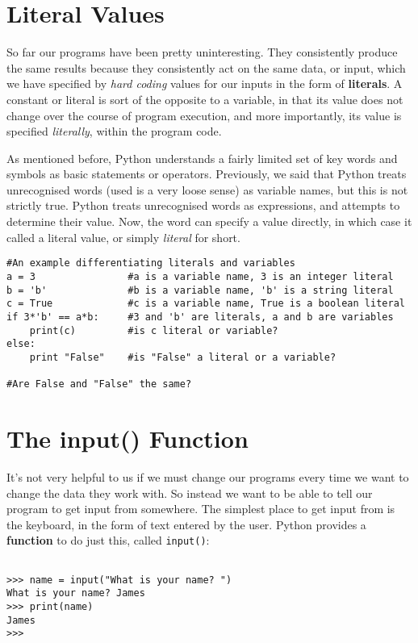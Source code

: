
\section{Literal Values}

So far our programs have been pretty uninteresting. They     consistently produce the same results because they consistently act on     the same data, or input, which we have specified by \textit{hard       coding} values for our inputs in the form of     \textbf{literals}. A constant or literal is sort of the opposite to a     variable, in that its value does not change over the course of program     execution, and more importantly, its value is specified     \textit{literally}, within the program code.

As mentioned before, Python understands a fairly limited set of key     words and symbols as basic statements or operators. Previously, we     said that Python treats unrecognised words (used is a very loose sense)     as variable names, but this is not strictly true. Python treats     unrecognised words as expressions, and attempts to determine their     value. Now, the word can specify a value directly, in which case it     called a literal value, or simply \textit{literal} for short. 
\begin{lstlisting}
#An example differentiating literals and variables
a = 3                #a is a variable name, 3 is an integer literal
b = 'b'              #b is a variable name, 'b' is a string literal
c = True             #c is a variable name, True is a boolean literal
if 3*'b' == a*b:     #3 and 'b' are literals, a and b are variables
    print(c)         #is c literal or variable?
else:
    print "False"    #is "False" a literal or a variable?

#Are False and "False" the same?
\end{lstlisting}

\section{The input() Function}

It's not very helpful to us if we must change our programs every     time we want to change the data they work with. So instead we want to     be able to tell our program to get input from somewhere. The simplest     place to get input from is the keyboard, in the form of text entered by     the user. Python provides a \textbf{function} to do just this,     called \texttt{input()}:
\begin{lstlisting}

>>> name = input("What is your name? ")
What is your name? James
>>> print(name)
James
>>>
\end{lstlisting}


